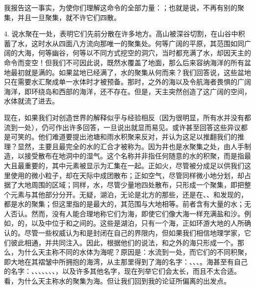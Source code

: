 我报告这一事实，为使你们理解这命令的全部力量：；也就是说，不再有别的聚集，并且一旦聚集，就不许它们四散。\par

4. 说水聚在一处，表明它们先前分散在许多地方。高山被深谷切割，在山谷中积蓄了水，这时水从四面八方流向那唯一的聚集处。何等广阔的平原，其范围如同广阔的大海，何等幽谷，何等以不同方式挖空的洞穴，当时都充满了水，却因天主的命令而变空！但我们不可因此说，既然水覆盖了地面，那么后来容纳海洋的所有盆地最初就是满的。如果盆地已经满了，水的聚集从何而来？我们回答说，这些盆地只在需要水汇聚成单一水体时才被预备。那时，之外的海以及令航海者畏惧的广阔海洋，即环绕岛和西部的海洋，还不存在。但是，天主突然创造了这广阔的空间，水体就流了进去。\par

现在，如果我们对创造世界的解释似乎与经验相反（因为很明显，所有水并没有都流到一处），仍可作出许多回答，一旦说出就显而易见。或许甚至回答这些异议都是可笑的。他们难道要提出池塘和雨水积聚来反对，并认为这足以推翻我们的推理？显然，主要且最完全的水的汇合才被称为。因为井也是水聚集之处，由人手制造，以接受散布在地洞中的湿气。这个名称并非指任何随意的水的积聚，而是指最大且最重要的，其中元素被显示为汇集在一起。正如火，尽管被分成足以供我们这里使用的微小粒子，却在天际中成团散布；正如空气，尽管同样微小地分划，却占据了大地周围的区域；同样，水，尽管少量地四处散布，只形成一个聚集，即把整个元素与其他部分分开。无疑，湖泊，无论是北方的那些，还是在、、和发现的，都是水的聚集；但这里指的是最大的，其范围与大地相等。前者含有大量的水；无人否认。然而，没有人能合理地称它们为海，即使它们像大海一样充满盐和沙。例如，的，以及中位于和之间的。这些是湖泊，只有一个海，正如环游大地的人所确认的。尽管一些权威认为和是封闭在自己的界限内，但如果我们相信地理学家，它们彼此相通，并共同注入。因此，根据他们的说法，和之外的海只形成一个。那么，为什么天主称不同的水体为海呢？原因是：水流到一处，而它们的不同积聚，即大地在其褶皱中所拥抱的海湾，从主那里得到了海的名字：、、、。海甚至有自己的名字：、、、、、、、，以及许多其他名字，现在列举它们会太长，而且不太合适。看，为什么天主称水的聚集为海。但让我们回到我的论证所偏离的出发点。\par

